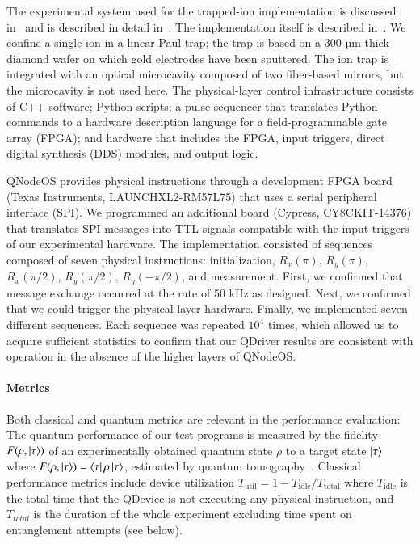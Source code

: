 The experimental system used for the trapped-ion implementation is discussed in~\cite{teller2023integrating,teller2021heating} and is described in detail in~\cite{teller_measuring_2021}. The implementation itself is described in~\cite{fioretto_towards_2020}. We confine a single \CaPlus ion in a linear Paul trap; the trap is based on a 300 µm thick diamond wafer on which gold electrodes have been sputtered. The ion trap is integrated with an optical microcavity composed of two fiber-based mirrors, but the microcavity is not used here. The physical-layer control infrastructure consists of C++ software; Python scripts; a pulse sequencer that translates Python commands to a hardware description language for a field-programmable gate array (FPGA); and hardware that includes the FPGA, input triggers, direct digital synthesis (DDS) modules, and output logic.

QNodeOS provides physical instructions through a development FPGA board (Texas Instruments, LAUNCHXL2-RM57L75) that uses a serial peripheral interface (SPI). We programmed an additional board (Cypress, CY8CKIT-14376) that translates SPI messages into TTL signals compatible with the input triggers of our experimental hardware.
The implementation consisted of sequences composed of seven physical instructions: initialization, $R_x(\pi)$, $R_y(\pi)$, $R_x(\pi/2)$, $R_y(\pi/2)$, $R_y(-\pi/2)$, and measurement. First, we confirmed that message exchange occurred at the rate of 50 kHz as designed. Next, we confirmed that we could trigger the physical-layer hardware. Finally, we implemented seven different sequences. Each sequence was repeated $10^4$ times, which allowed us to acquire sufficient statistics to confirm that our QDriver results are consistent with operation in the absence of the higher layers of QNodeOS.

\paragraph{Metrics}

Both classical and quantum metrics are relevant in the performance evaluation: The quantum performance of our test programs is measured by the fidelity $F(\rho,\ket{\tau})$ of an experimentally obtained quantum state $\rho$ to a target state $\ket{\tau}$ where $F(\rho,\ket{\tau}) = \bra{\tau}\rho\ket{\tau}$, estimated by quantum tomography~\cite{paris_quantum_2004}. Classical performance metrics include device utilization $T_{\text{util}} = 1 - T_{\text{idle}} / T_{\text{total}}$ where $T_{\text{idle}}$ is the total time that the QDevice is not executing any physical instruction, and $T_{total}$ is the duration of the whole experiment excluding time spent on entanglement attempts (see below).


